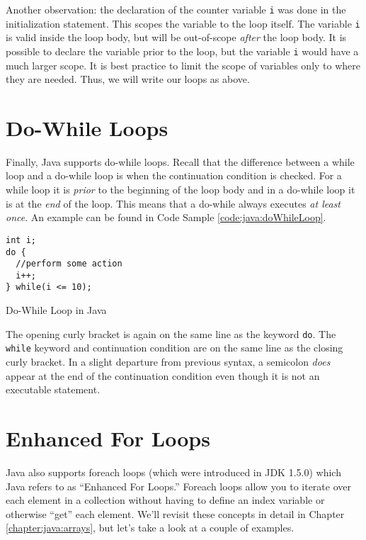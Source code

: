 Another observation: the declaration of the counter variable \texttt{i} 
was done in the initialization statement.  This scopes the variable to the loop itself.
The variable \texttt{i} is valid inside the loop body, but will be out-of-scope
\emph{after} the loop body.  It is possible to declare the variable prior to the loop, but
the variable \texttt{i} would have a much larger scope.  It is best practice 
to limit the scope of variables only to where they are needed.  Thus, we will
write our loops as above.

\section{Do-While Loops}

Finally, Java supports do-while loops.  Recall that the difference between a
while loop and a do-while loop is when the continuation condition is checked.
For a while loop it is \emph{prior} to the beginning of the loop body and in
a do-while loop it is at the \emph{end} of the loop.  This means that a do-while 
always executes \emph{at least once}.  An example can be found in Code
Sample \ref{code:java:doWhileLoop}.

\begin{listing}
\begin{verbatim}
int i;
do {
  //perform some action
  i++;
} while(i <= 10);
\end{verbatim}
  \caption{Do-While Loop in Java}
  \label{code:java:doWhileLoop}
\end{listing}

The opening curly bracket is again on the same
line as the keyword \texttt{do}.  The \texttt{while} keyword and
continuation condition are on the same line as the closing curly bracket.
In a slight departure from previous syntax, a semicolon \emph{does} appear
at the end of the continuation condition even though it is not an
executable statement.

\section{Enhanced For Loops}

Java also supports foreach loops (which were introduced in JDK 1.5.0) which
Java refers to as ``Enhanced For Loops.''  Foreach loops allow you to 
iterate over each element in a collection without having to define an index
variable or otherwise ``get'' each element.  We'll revisit these concepts
in detail in Chapter \ref{chapter:java:arrays}, but let's take a look 
at a couple of examples.

